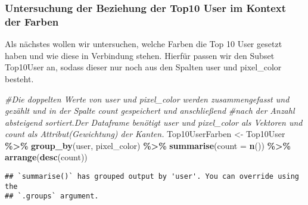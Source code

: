 \documentclass[
]{article}
\newenvironment{Shaded}{\begin{snugshade}}{\end{snugshade}}
\newcommand{\AttributeTok}[1]{\textcolor[rgb]{0.13,0.29,0.53}{#1}}
\newcommand{\CommentTok}[1]{\textcolor[rgb]{0.56,0.35,0.01}{\textit{#1}}}
\newcommand{\FunctionTok}[1]{\textcolor[rgb]{0.13,0.29,0.53}{\textbf{#1}}}
\newcommand{\NormalTok}[1]{#1}
\newcommand{\OtherTok}[1]{\textcolor[rgb]{0.56,0.35,0.01}{#1}}
\newcommand{\SpecialCharTok}[1]{\textcolor[rgb]{0.81,0.36,0.00}{\textbf{#1}}}
\begin{document}
\subsubsection{Untersuchung der Beziehung der Top10 User im Kontext der
Farben}\label{untersuchung-der-beziehung-der-top10-user-im-kontext-der-farben}

Als nächstes wollen wir untersuchen, welche Farben die Top 10 User
gesetzt haben und wie diese in Verbindung stehen. Hierfür passen wir den
Subset Top10User an, sodass dieser nur noch aus den Spalten user und
pixel\_color besteht.

\begin{Shaded}
\begin{Highlighting}[]
\CommentTok{\#Die doppelten Werte von user und pixel\_color werden zusammengefasst und gezählt und in der Spalte count gespeichert und anschließend }
\CommentTok{\#nach der Anzahl absteigend sortiert.Der Dataframe benötigt user und pixel\_color als Vektoren und count als Attribut(Gewichtung) der Kanten.}
\NormalTok{Top10UserFarben }\OtherTok{\textless{}{-}}\NormalTok{ Top10User }\SpecialCharTok{\%\textgreater{}\%} \FunctionTok{group\_by}\NormalTok{(user, pixel\_color) }\SpecialCharTok{\%\textgreater{}\%} \FunctionTok{summarise}\NormalTok{(}\AttributeTok{count =} \FunctionTok{n}\NormalTok{()) }\SpecialCharTok{\%\textgreater{}\%} \FunctionTok{arrange}\NormalTok{(}\FunctionTok{desc}\NormalTok{(count))}
\end{Highlighting}
\end{Shaded}

\begin{verbatim}
## `summarise()` has grouped output by 'user'. You can override using the
## `.groups` argument.
\end{verbatim}
\end{document}
